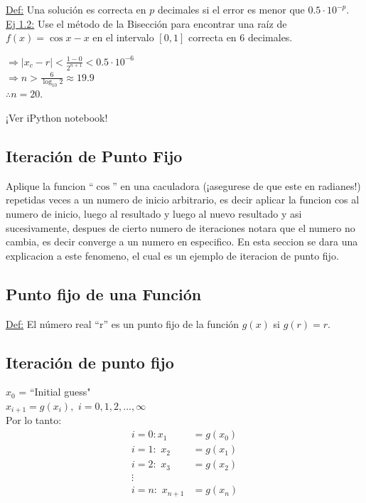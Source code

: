 \underline{Def:} Una solución es correcta en \(p\) decimales si el error es menor que \(0.5 \cdot 10^{-p}\).\\
\vspace{0.5cm}
\underline{Ej 1.2:} Use el método de la Bisección para encontrar una raíz de \(f(x) = \cos{x} - x\) en el intervalo \([0, 1]\) correcta en 6 decimales.
\begin{center}
$\Rightarrow |x_c - r| < \frac{1-0}{2^{n+1}} < 0.5 \cdot 10^{-6}$\\
\vspace{0.5cm}
$\Rightarrow n > \frac{6}{\log_{10}2} \approx 19.9$\\
\vspace{0.5cm}
\hspace{1cm} $\therefore n = 20.$
\end{center}
¡Ver iPython notebook!
\subsection{Iteración de Punto Fijo}
Aplique la funcion ``\(\cos\)'' en una caculadora (¡asegurese de que este en radianes!) repetidas veces a un numero de inicio arbitrario, es decir aplicar la funcion cos al numero de inicio, luego al resultado y luego al nuevo resultado y asi sucesivamente, despues de cierto numero de iteraciones notara que el numero no cambia, es decir converge a un numero en especifico. En esta seccion se dara  una explicacion a este fenomeno, el cual es un ejemplo de iteracion de punto fijo.     

\raggedright
\subsection*{Punto fijo de una Función}
\underline{Def:} El número real ``r'' es un punto fijo de la función \(g(x)\) si \(g(r) = r\).\\
\subsection*{Iteración de punto fijo}
\(x_0\) = ``Initial guess"\\
\(x_{i+1} = g(x_i),\,\, i = 0, 1, 2, ..., \infty\)\\
Por lo tanto:\\
\begin{equation*}
	\begin{aligned}
		i = 0: x_1 &= g(x_0)\\ 
		i = 1:\,\, x_2 &= g(x_1) \\
		i = 2:\,\, x_3 &= g(x_2) \\
 		\vdots \\ 
 		i = n:\,\, x_{n+1} &= g(x_n) 
	\end{aligned}
\end{equation*}

